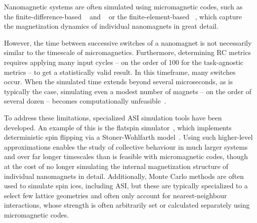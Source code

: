Nanomagnetic systems are often simulated using micromagnetic codes, such as the finite-difference-based \mumax~\cite{mumax3} and \oommf~\cite{OOMMF} or the finite-element-based \nmag~\cite{Nmag}, which capture the magnetization dynamics of individual nanomagnets in great detail. \par
However, the time between successive switches of a nanomagnet is not necessarily similar to the timescale of micromagnetics.
Furthermore, determining RC metrics requires applying many input cycles -- on the order of 100 for the task-agnostic metrics -- to get a statistically valid result.
In this timeframe, many switches occur.
When the simulated time extends beyond several microseconds, as is typically the case, simulating even a modest number of magnets -- on the order of several dozen -- becomes computationally unfeasible~\cite{leo2021chiral}. \\\par

To address these limitations, specialized ASI simulation tools have been developed.
An example of this is the flatspin simulator~\cite{flatspin}, which implements deterministic spin flipping via a Stoner-Wohlfarth model~\cite{StonerWohlfarth2008}.
Using such higher-level approximations enables the study of collective behaviour in much larger systems and over far longer timescales than is feasible with micromagnetic codes, though at the cost of no longer simulating the internal magnetization structure of individual nanomagnets in detail.
Additionally, Monte Carlo methods are often used to simulate spin ices, including ASI, but these are typically specialized to a select few lattice geometries and often only account for nearest-neighbour interactions, whose strength is often arbitrarily set or calculated separately using micromagnetic codes.~\cite{MeltingASI,sklenar2019field,gilbert2014emergent,zhang2013crystallites} \\\par %

